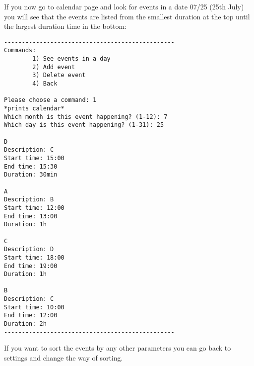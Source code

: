 \documentclass[a4paper, 12pt]{article}
\begin{document}
    If you now go to calendar page and look for events in a date 07/25 (25th July) you will see that the events are listed from the smallest duration at the top until the largest duration time in the bottom:
    
\begin{verbatim}
------------------------------------------------
Commands:
        1) See events in a day
        2) Add event
        3) Delete event
        4) Back
                    
Please choose a command: 1
*prints calendar*
Which month is this event happening? (1-12): 7
Which day is this event happening? (1-31): 25

D
Description: C
Start time: 15:00
End time: 15:30
Duration: 30min

A
Description: B
Start time: 12:00
End time: 13:00
Duration: 1h

C
Description: D
Start time: 18:00
End time: 19:00
Duration: 1h

B
Description: C
Start time: 10:00
End time: 12:00
Duration: 2h
------------------------------------------------
\end{verbatim}    

If you want to sort the events by any other parameters you can go back to settings and change the way of sorting.
\end{document}
